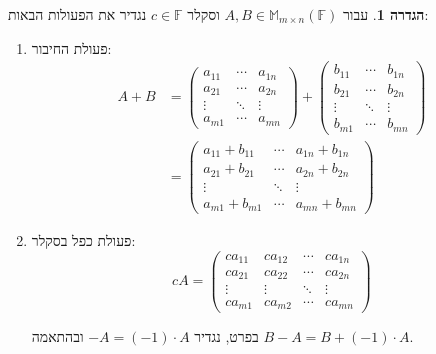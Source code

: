\documentclass[12pt]{report}
\theoremstyle{plain}
\theoremstyle{definition}
\newtheorem{definition}[theorem]{הגדרה}
\newcommand{\F}{\mathbb{F}}
\newcommand{\M}{\mathbb{M}}
\newcommand{\0}{\mathbf{0}}
\begin{document}
\begin{definition}
עבור
$A,B\in\M_{m\times n}(\F)$
וסקלר
$c\in\F$
נגדיר את הפעולות הבאות:

\begin{enumerate}[label=\alph*.]
\item 
פעולת החיבור:
$$
\begin{aligned}
A+B&=\begin{pmatrix}a_{11} & \cdots & a_{1n}\\
a_{21} & \cdots & a_{2n}\\
\vdots  & \ddots & \vdots\\
a_{m1}  & \cdots & a_{mn}
\end{pmatrix}+\begin{pmatrix}b_{11} & \cdots & b_{1n}\\
b_{21} & \cdots & b_{2n}\\
\vdots & \ddots & \vdots\\
b_{m1} & \cdots & b_{mn}
\end{pmatrix}\\
&=\begin{pmatrix}a_{11}+b_{11} & \cdots & a_{1n}+b_{1n} \\ a_{21}+b_{21} & \cdots & a_{2n}+b_{2n}\\
\vdots & \ddots & \vdots\\
a_{m1}+b_{m1} & \cdots & a_{mn}+b_{mn}
\end{pmatrix}
\end{aligned}
$$


\item
פעולת כפל בסקלר:
$$
c A=\begin{pmatrix}ca_{11} & ca_{12} & \cdots & ca_{1n}\\
ca_{21} & ca_{22} & \cdots & ca_{2n}\\
\vdots & \vdots & \ddots & \vdots\\
ca_{m1} & ca_{m2} & \cdots & ca_{mn}
\end{pmatrix}
$$

בפרט, נגדיר
$-A=(-1)\cdot A$ 
ובהתאמה 
$B-A=B+(-1)\cdot A$.


\end{enumerate}
\end{definition}
\end{document}
